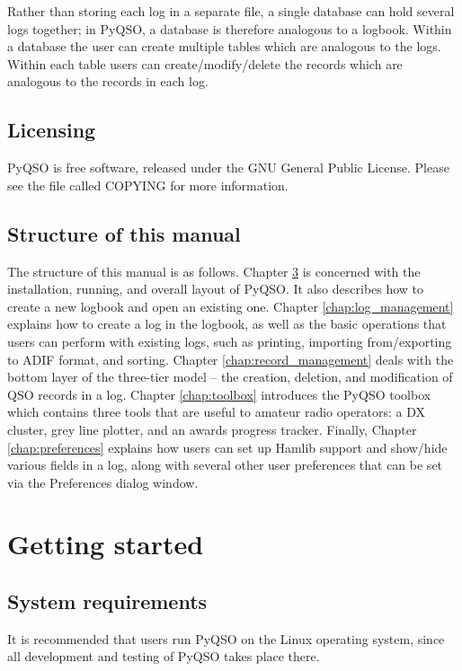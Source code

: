 \documentclass[11pt, a4paper]{report}
\begin{document}
Rather than storing each log in a separate file, a single database can hold several logs together; in PyQSO, a database is therefore analogous to a logbook. Within a database the user can create multiple tables which are analogous to the logs. Within each table users can create/modify/delete the records which are analogous to the records in each log.

\section{Licensing}
PyQSO is free software, released under the GNU General Public License. Please see the file called COPYING for more information.

\section{Structure of this manual}
The structure of this manual is as follows. Chapter \ref{chap:getting_started} is concerned with the installation, running, and overall layout of PyQSO. It also describes how to create a  new logbook and open an existing one. Chapter \ref{chap:log_management} explains how to create a log in the logbook, as well as the basic operations that users can perform with existing logs, such as printing, importing from/exporting to ADIF format, and sorting. Chapter \ref{chap:record_management} deals with the bottom layer of the three-tier model -- the creation, deletion, and modification of QSO records in a log. Chapter \ref{chap:toolbox} introduces the PyQSO toolbox which contains three tools that are useful to amateur radio operators: a DX cluster, grey line plotter, and an awards progress tracker. Finally, Chapter \ref{chap:preferences} explains how users can set up Hamlib support and show/hide various fields in a log, along with several other user preferences that can be set via the Preferences dialog window.

\chapter{Getting started}\label{chap:getting_started}

\section{System requirements}
It is recommended that users run PyQSO on the Linux operating system, since all development and testing of PyQSO takes place there.
\end{document}
